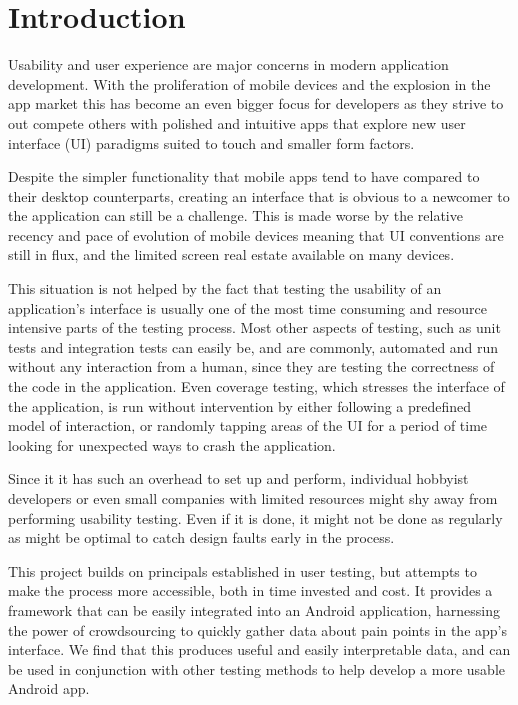 \chapter{Introduction}

Usability and user experience are major concerns in modern application
development. With the proliferation of mobile devices and the explosion in the
app market this has become an even bigger focus for developers as they strive
to out compete others with polished and intuitive apps that explore new user
interface (UI) paradigms suited to touch and smaller form factors.

Despite the simpler functionality that mobile apps tend to have compared to
their desktop counterparts, creating an interface that is obvious to a newcomer
to the application can still be a challenge. This is made worse by the relative
recency and pace of evolution of mobile devices meaning that UI conventions are
still in flux, and the limited screen real estate available on many devices.

This situation is not helped by the fact that testing the usability of an
application's interface is usually one of the most time consuming and resource
intensive parts of the testing process. Most other aspects of testing, such as
unit tests and integration tests can easily be, and are commonly, automated and
run without any interaction from a human, since they are testing the
correctness of the code in the application. Even coverage testing, which
stresses the interface of the application, is run without intervention by
either following a predefined model of interaction, or randomly tapping areas
of the UI for a period of time looking for unexpected ways to crash the
application.

Since it it has such an overhead to set up and perform, individual hobbyist
developers or even small companies with limited resources might shy away from
performing usability testing. Even if it is done, it might not be done as
regularly as might be optimal to catch design faults early in the process.

This project builds on principals established in user testing, but attempts
to make the process more accessible, both in time invested and cost. It 
provides a framework that can be easily integrated into an Android application,
harnessing the power of crowdsourcing to quickly gather data about pain
points in the app's interface. We find that this produces useful and
easily interpretable data, and can be used in conjunction with other
testing methods to help develop a more usable Android app.
